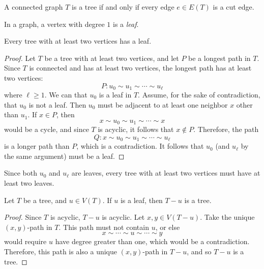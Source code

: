 \documentclass[12pt]{article}
\begin{document}
\begin{thm}
    A connected graph $T$ is a tree if and only if every edge $e \in E(T)$ is a cut edge.
\end{thm}

\begin{defn}
    In a graph, a vertex with degree $1$ is a \emph{leaf}.
\end{defn}

\begin{thm}\label{tree-has-leaf}
    Every tree with at least two vertices has a leaf.
\end{thm}

\begin{proof}
    Let $T$ be a tree with at least two vertices, and let $P$ be a longest path in $T$. Since $T$ is connected and has at least two vertices, the longest path has at least two vertices:
    \[P: u_0 \sim u_1 \sim \cdots \sim u_{\ell}\] where $\ell \geq 1$. We can that $u_0$ is a leaf in $T$. Assume, for the sake of contradiction, that $u_0$ is not a leaf. Then $u_0$ must be adjacent to at least one neighbor $x$ other than $u_1$. If $x \in P$, then
    \[x \sim u_0 \sim u_1 \sim \cdots \sim x\] would be a cycle, and since $T$ is acyclic, it follows that $x \notin P$. Therefore, the path
    \[Q: x \sim u_0 \sim u_1 \sim \cdots \sim u_{\ell}\] is a longer path than $P$, which is a contradiction. It follows that $u_0$ (and $u_{\ell}$ by the same argument) must be a leaf.
\end{proof}

\begin{rmk}
    Since both $u_0$ and $u_{\ell}$ are leaves, every tree with at least two vertices must have at least two leaves.
\end{rmk}

\begin{prop}\label{tree-minus-leaf}
    Let $T$ be a tree, and $u \in V(T)$. If $u$ is a leaf, then $T - u$ is a tree.
\end{prop}

\begin{proof}
    Since $T$ is acyclic, $T - u$ is acyclic. Let $x, y \in V(T - u)$. Take the unique $(x, y)$-path in $T$. This path must not contain $u$, or else
    \[x \sim \cdots \sim u \sim \cdots \sim y\] would require $u$ have degree greater than one, which would be a contradiction. Therefore, this path is also a unique $(x, y)$-path in $T - u$, and so $T - u$ is a tree.
\end{proof}
\end{document}
